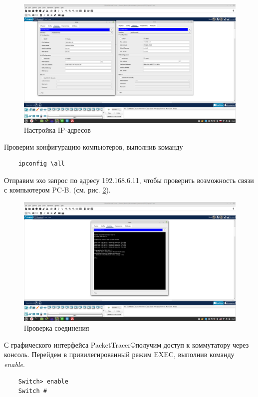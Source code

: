 \documentclass[a4paper,14pt]{extarticle}
\newcommand{\pt}{PacketTracer\copyright}
\begin{document}
\begin{figure}[h!]
	\centering
	\includegraphics[width=0.7\linewidth]{images/IPs}
	\caption{Настройка IP-адресов}
	\label{fig:ips}
\end{figure}

Проверим конфигурацию компьютеров, выполнив команду 
\begin{lstlisting}
	ipconfig \all
\end{lstlisting}
Отправим эхо запрос по адресу 192.168.6.11, чтобы проверить возможность связи с компьютером PC-B. (см. рис. \ref{fig:ping-pc-b}).
\begin{figure}
	\centering
	\includegraphics[width=0.7\linewidth]{images/ping-pc-b}
	\caption{Проверка соединения}
	\label{fig:ping-pc-b}
\end{figure}

С графического интерфейса \pt получим доступ к  коммутатору через консоль.
Перейдем в привилегированный режим EXEC, выполнив команду \textit{enable}.
\begin{lstlisting}
	Switch> enable
	Switch #
\end{lstlisting}
\end{document}
